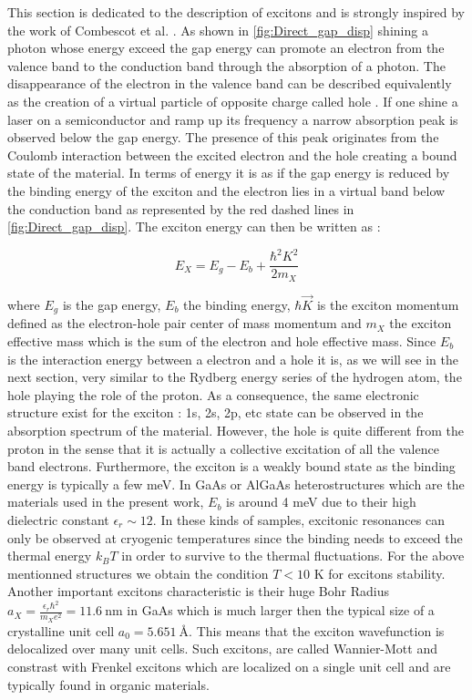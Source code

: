 \label{sub:exciton}
This section is dedicated to the description of excitons and is strongly inspired by the work of Combescot et al. \cite{Combescot_cooper_excitons_2015}.
As shown in \autoref{fig:Direct_gap_disp} shining a photon whose energy exceed the gap energy can promote an electron from the valence band to the conduction band through the absorption of a photon. 
The disappearance of the electron in the valence band can be described equivalently as the creation of a virtual particle of opposite charge called hole \cite{Combescot_cooper_excitons_2015}.
 If one shine a laser on a semiconductor and ramp up its frequency a narrow absorption peak is observed below the gap energy.  The presence of this peak originates from the Coulomb interaction between the excited electron and the hole creating a bound state of the material. In terms of energy it is as if the gap energy is reduced by the binding energy of the exciton and the electron lies in a virtual band below the conduction band as represented by the red dashed lines in \autoref{fig:Direct_gap_disp}.
 The exciton energy can then be written as : 

\begin{equation}
    E_{X} = E_g - E_b + \frac{\hbar^2 K^2}{2m_{X}}
\end{equation}

where $E_g$ is the gap energy, $E_b$ the binding energy,  $\hbar \vec{K}$ is the exciton momentum defined as the electron-hole pair center of mass momentum and $m_{X}$ the exciton effective mass which is the sum of the electron and hole effective mass.
Since $E_b$ is the interaction energy between a electron and a hole it is, as we will see in the next section, very similar to the Rydberg energy series of the hydrogen atom, the hole playing the role of the proton. As a consequence, the same electronic structure exist for the exciton : 1s, 2s, 2p, etc state can be observed in the absorption spectrum of the material.
However, the hole is quite different from the proton in the sense that it is actually a collective excitation of all the valence band electrons. Furthermore, the exciton is a weakly bound state as the binding energy is typically a few meV. In GaAs or AlGaAs heterostructures which are the materials used in the present work, $E_b$ is around 4 meV due to their high dielectric constant $\epsilon_r \sim 12$.
In these kinds of samples, excitonic resonances can only be observed at cryogenic temperatures since the binding needs to exceed the thermal energy $k_B T$ in order to survive to the thermal fluctuations. For the above mentionned structures we obtain the condition $T<10$ K for excitons stability.
Another important excitons characteristic is their huge Bohr Radius $a_X= \frac{\epsilon_r \hbar^2}{m_X e^2}= 11.6 \ \mathrm{nm}$ in GaAs which is much larger then the typical size of a crystalline unit cell $a_0 = 5.65 \SI{1}{\angstrom}$. This means that the exciton wavefunction is delocalized over many unit cells. Such excitons, are called Wannier-Mott and constrast with Frenkel excitons which are localized on a single unit cell and are typically found in organic materials.
 \bigskip\noindent

